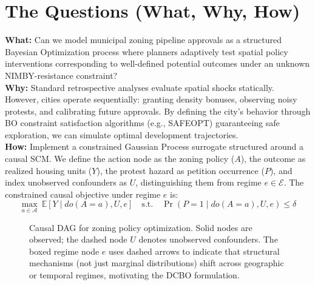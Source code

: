 \documentclass[11pt,twoside]{article}
\begin{document}
\section*{The Questions (What, Why, How)}
\textbf{What:} Can we model municipal zoning pipeline approvals as a structured Bayesian Optimization process where planners adaptively test spatial policy interventions corresponding to well-defined potential outcomes under an unknown NIMBY-resistance constraint? \\
\textbf{Why:} Standard retrospective analyses evaluate spatial shocks statically. However, cities operate sequentially: granting density bonuses, observing noisy protests, and calibrating future approvals. By defining the city's behavior through BO constraint satisfaction algorithms (e.g., SAFEOPT) guaranteeing safe exploration, we can simulate optimal development trajectories. \\
\textbf{How:} Implement a constrained Gaussian Process surrogate structured around a causal SCM. We define the action node as the zoning policy ($A$), the outcome as realized housing units ($Y$), the protest hazard as petition occurrence ($P$), and index unobserved confounders as $U$, distinguishing them from regime $e \in \mathcal{E}$. The constrained causal objective under regime $e$ is:
\[
    \max_{a \in \mathcal{A}} \ \mathbb{E}[Y \mid do(A=a), U, e] \quad \text{s.t.}\quad \Pr(P=1 \mid do(A=a), U, e) \le \delta
\]

\begin{figure}[h]
\centering
{}
\caption*{\footnotesize Causal DAG for zoning policy optimization. Solid nodes are observed; the dashed node $U$ denotes unobserved confounders. The boxed regime node $e$ uses dashed arrows to indicate that structural mechanisms (not just marginal distributions) shift across geographic or temporal regimes, motivating the DCBO formulation.}
\end{figure}
\end{document}
